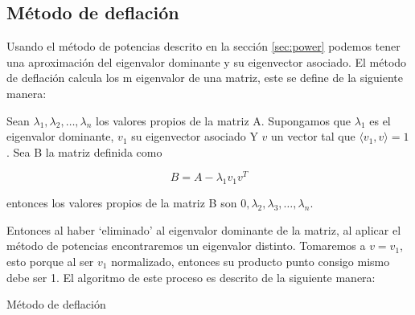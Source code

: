 \subsection{Método de deflación}

Usando el método de potencias descrito en la sección \ref{sec:power} podemos tener una aproximación del eigenvalor dominante y su eigenvector asociado. El método de deflación calcula los m eigenvalor de una matriz, este se define de la siguiente manera:

Sean $\lambda_1,\lambda_2,\dots,\lambda_n$ los valores propios de la matriz A. Supongamos que $\lambda_1$ es el eigenvalor dominante, $v_1$ su eigenvector asociado Y $v$ un vector tal que $\langle v_1, v \rangle = 1$. Sea B la matriz definida como

\begin{equation*}
    B =A -\lambda_1 v_1 v^T
\end{equation*}

entonces los valores propios de la matriz B son $0,\lambda_2,\lambda_3,\dots,\lambda_n$.

Entonces al haber `eliminado' al eigenvalor dominante de la matriz, al aplicar el método de potencias encontraremos un eigenvalor distinto. Tomaremos a $v=v_1$, esto porque al ser $v_1$ normalizado, entonces su producto punto consigo mismo debe ser 1. El algoritmo de este proceso es descrito de la siguiente manera:


\begin{algorithm}[H]
    \caption{Método de deflación}
    \label{alg:deflation_method}
\end{algorithm}
